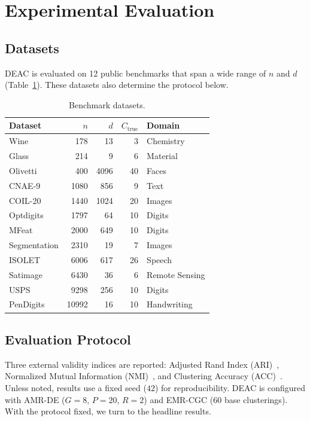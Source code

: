 \documentclass[conference]{IEEEtran}
\begin{document}
\section{Experimental Evaluation}\label{sec:exp}

\subsection{Datasets}

DEAC is evaluated on 12 public benchmarks that span a wide range of $n$ and $d$ (Table~\ref{tab:datasets}). These datasets also determine the protocol below.

\begin{table}[htbp]
\centering
\caption{Benchmark datasets.}
\label{tab:datasets}
\footnotesize
\setlength{\tabcolsep}{4pt}
\begin{tabular}{lrrrl}
\toprule
Dataset & $n$ & $d$ & $C_{\text{true}}$ & Domain \\
\midrule
Wine         & 178   & 13   & 3  & Chemistry \\
Glass        & 214   & 9    & 6  & Material \\
Olivetti     & 400   & 4096 & 40 & Faces \\
CNAE-9       & 1080  & 856  & 9  & Text \\
COIL-20      & 1440  & 1024 & 20 & Images \\
Optdigits    & 1797  & 64   & 10 & Digits \\
MFeat        & 2000  & 649  & 10 & Digits \\
Segmentation & 2310  & 19   & 7  & Images \\
ISOLET       & 6006  & 617  & 26 & Speech \\
Satimage     & 6430  & 36   & 6  & Remote Sensing \\
USPS         & 9298  & 256  & 10 & Digits \\
PenDigits    & 10992 & 16   & 10 & Handwriting \\
\bottomrule
\end{tabular}
\end{table}

\subsection{Evaluation Protocol}

Three external validity indices are reported: Adjusted Rand Index (ARI)~\cite{hubert1985comparing}, Normalized Mutual Information (NMI)~\cite{strehl2002cluster}, and Clustering Accuracy (ACC)~\cite{yang2010image}. Unless noted, results use a fixed seed ($42$) for reproducibility. DEAC is configured with AMR-DE ($G{=}8$, $P{=}20$, $R{=}2$) and EMR-CGC (60 base clusterings). With the protocol fixed, we turn to the headline results.
\end{document}
